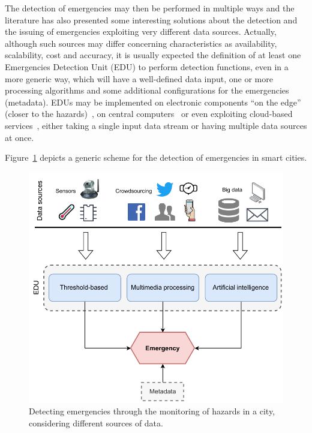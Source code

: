\begin{refsection}
The detection of emergencies may then be performed in multiple ways and the literature has also presented some interesting solutions about the detection and the issuing of emergencies exploiting very different data sources. Actually, although such sources may differ concerning characteristics as availability, scalability, cost and accuracy, it is usually expected the definition of at least one Emergencies Detection Unit (EDU) to perform detection functions, even in a more generic way, which will have a well-defined data input, one or more processing algorithms and some additional configurations for the emergencies (metadata). EDUs may be implemented on electronic components ``on the edge'' (closer to the hazards)~\cite{PlatformsSC,sensorsplatforms}, on central computers~\cite{twitterDetection2,centralserver1} or even exploiting cloud-based services~\cite{cloud1}, either taking a single input data stream or having multiple data sources at once. 

Figure~\ref{Fig:detection} depicts a generic scheme for the detection of emergencies in smart cities. 

\begin{figure}[ht]
  \centering
  \includegraphics[scale=0.6]{Chapters/2-Survey/images/detection.pdf}
  \caption{Detecting emergencies through the monitoring of hazards in a city, considering different sources of data.}\label{Fig:detection}
\end{figure}


\end{refsection}
